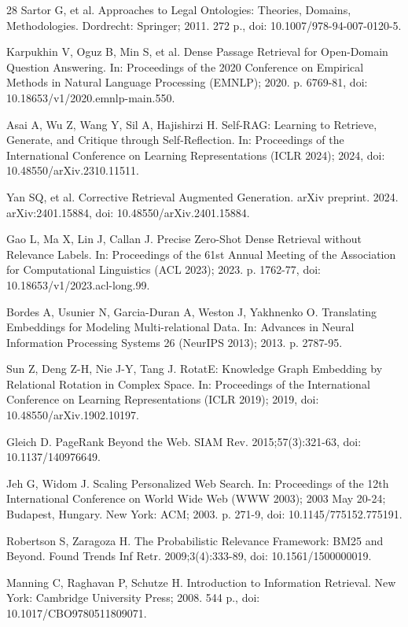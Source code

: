 \documentclass{IOS-Book-Article}
\begin{document}
\begin{thebibliography}{28}
Sartor G, et al. Approaches to Legal Ontologies: Theories, Domains, Methodologies. Dordrecht: Springer; 2011. 272 p., doi: 10.1007/978-94-007-0120-5.

Karpukhin V, Oguz B, Min S, et al. Dense Passage Retrieval for Open-Domain Question Answering. In: Proceedings of the 2020 Conference on Empirical Methods in Natural Language Processing (EMNLP); 2020. p. 6769-81, doi: 10.18653/v1/2020.emnlp-main.550.

Asai A, Wu Z, Wang Y, Sil A, Hajishirzi H. Self-RAG: Learning to Retrieve, Generate, and Critique through Self-Reflection. In: Proceedings of the International Conference on Learning Representations (ICLR 2024); 2024, doi: 10.48550/arXiv.2310.11511.

Yan SQ, et al. Corrective Retrieval Augmented Generation. arXiv preprint. 2024. arXiv:2401.15884, doi: 10.48550/arXiv.2401.15884.

Gao L, Ma X, Lin J, Callan J. Precise Zero-Shot Dense Retrieval without Relevance Labels. In: Proceedings of the 61st Annual Meeting of the Association for Computational Linguistics (ACL 2023); 2023. p. 1762-77, doi: 10.18653/v1/2023.acl-long.99.

Bordes A, Usunier N, Garcia-Duran A, Weston J, Yakhnenko O. Translating Embeddings for Modeling Multi-relational Data. In: Advances in Neural Information Processing Systems 26 (NeurIPS 2013); 2013. p. 2787-95.

Sun Z, Deng Z-H, Nie J-Y, Tang J. RotatE: Knowledge Graph Embedding by Relational Rotation in Complex Space. In: Proceedings of the International Conference on Learning Representations (ICLR 2019); 2019, doi: 10.48550/arXiv.1902.10197.

Gleich D. PageRank Beyond the Web. SIAM Rev. 2015;57(3):321-63, doi: 10.1137/140976649.

Jeh G, Widom J. Scaling Personalized Web Search. In: Proceedings of the 12th International Conference on World Wide Web (WWW 2003); 2003 May 20-24; Budapest, Hungary. New York: ACM; 2003. p. 271-9, doi: 10.1145/775152.775191.

Robertson S, Zaragoza H. The Probabilistic Relevance Framework: BM25 and Beyond. Found Trends Inf Retr. 2009;3(4):333-89, doi: 10.1561/1500000019.

Manning C, Raghavan P, Schutze H. Introduction to Information Retrieval. New York: Cambridge University Press; 2008. 544 p., doi: 10.1017/CBO9780511809071.


\end{thebibliography}
\end{document}
